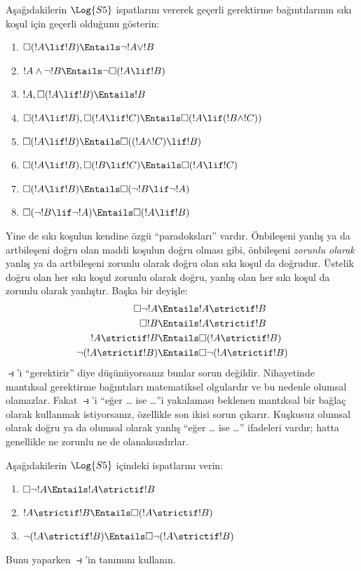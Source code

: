 \documentclass[../../../include/open-logic-section]{subfiles}
\begin{document}
\begin{prob}
  Aşağıdakilerin $\Log{S5}$ ispatlarını vererek geçerli gerektirme
  bağıntılarının sıkı koşul için geçerli olduğunu gösterin:
  \begin{enumerate}
  \item  $\Box(!A \lif !B) \Entails \lnot !A \lor !B$
  \item $!A \land \lnot !B \Entails \lnot\Box(!A \lif !B)$
  \item $!A, \Box(!A \lif !B) \Entails !B$
  \item $\Box(!A \lif !B), \Box(!A \lif !C) \Entails \Box(!A \lif (!B
    \land !C))$
  \item $\Box(!A \lif !B) \Entails \Box((!A \land !C) \lif !B)$
  \item $\Box(!A \lif !B), \Box(!B \lif !C) \Entails \Box(!A
    \lif !C)$
  \item $\Box(!A \lif !B) \Entails \Box(\lnot !B \lif \lnot !A)$
  \item $\Box(\lnot !B \lif \lnot !A) \Entails \Box(!A \lif !B)$
  \end{enumerate}
\end{prob}

Yine de sıkı koşulun kendine özgü ``paradoksları'' vardır. Önbileşeni yanlış
ya da artbileşeni doğru olan maddi koşulun doğru olması gibi, önbileşeni
\emph{zorunlu olarak} yanlış ya da artbileşeni zorunlu olarak doğru olan
sıkı koşul da doğrudur. Üstelik doğru olan her sıkı koşul zorunlu olarak
doğru, yanlış olan her sıkı koşul da zorunlu olarak yanlıştır. Başka bir
deyişle:
\begin{align}
  \Box \lnot !A & \Entails !A \strictif !B\\
  \Box !B & \Entails !A \strictif !B\\
  !A \strictif !B& \Entails \Box(!A \strictif !B)\\
  \lnot(!A \strictif !B) & \Entails \Box\lnot(!A \strictif !B)
\end{align}
$\strictif$'i ``gerektirir'' diye düşünüyorsanız bunlar sorun değildir.
Nihayetinde mantıksal gerektirme bağıntıları matematiksel olgulardır ve bu
nedenle olumsal olamazlar. Fakat $\strictif$'i ``eğer \dots{} ise \dots''i
yakalaması beklenen mantıksal bir bağlaç olarak kullanmak istiyorsanız,
özellikle son ikisi sorun çıkarır. Kuşkusuz olumsal olarak doğru ya da
olumsal olarak yanlış ``eğer \dots{} ise \dots'' ifadeleri vardır; hatta
genellikle ne zorunlu ne de olanaksızdırlar.

\begin{prob}
  Aşağıdakilerin $\Log{S5}$ içindeki ispatlarını verin:
  \begin{enumerate}
    \item  $\Box \lnot !A \Entails !A \strictif !B$
    \item $!A \strictif !B \Entails \Box(!A \strictif !B)$
    \item $\lnot(!A \strictif !B) \Entails \Box\lnot(!A \strictif !B)$
  \end{enumerate}
  Bunu yaparken $\strictif$'in tanımını kullanın.
\end{prob}
\end{document}
